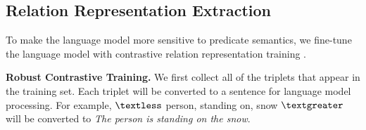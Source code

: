 \documentclass[letterpaper]{article} %
\begin{document}


\subsection{Relation Representation Extraction}
\label{RRE}
To make the language model more sensitive to predicate semantics, we fine-tune the language model with contrastive relation representation training \cite{li2022hero}.

\noindent \textbf{Robust Contrastive Training.} We first collect all of the triplets that appear in the training set.
Each triplet will be converted to a sentence for language model processing.
For example, $\textless$ person, standing on, snow $\textgreater$ will be converted to \textit{The person is standing on the snow}.
\end{document}
